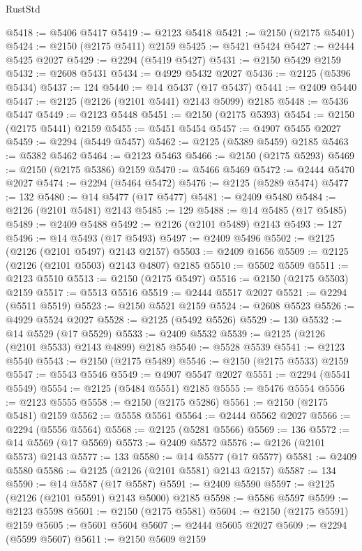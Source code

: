 \begin{lexlean}{RustStd}
\begin{coremodule}
@5418 := @5406 @5417
@5419 := @2123 @5418
@5421 := @2150 (@2175 @5401)
@5424 := @2150 (@2175 @5411) @2159
@5425 := @5421 @5424
@5427 := @2444 @5425 @2027
@5429 := @2294 (@5419 @5427)
@5431 := @2150 @5429 @2159
@5432 := @2608 @5431
@5434 := @4929 @5432 @2027
@5436 := @2125 (@5396 @5434)
@5437 := 124
@5440 := @14 @5437 (@17 @5437)
@5441 := @2409 @5440
@5447 := @2125 (@2126 (@2101 @5441) @2143 @5099) @2185
@5448 := @5436 @5447
@5449 := @2123 @5448
@5451 := @2150 (@2175 @5393)
@5454 := @2150 (@2175 @5441) @2159
@5455 := @5451 @5454
@5457 := @4907 @5455 @2027
@5459 := @2294 (@5449 @5457)
@5462 := @2125 (@5389 @5459) @2185
@5463 := @5382 @5462
@5464 := @2123 @5463
@5466 := @2150 (@2175 @5293)
@5469 := @2150 (@2175 @5386) @2159
@5470 := @5466 @5469
@5472 := @2444 @5470 @2027
@5474 := @2294 (@5464 @5472)
@5476 := @2125 (@5289 @5474)
@5477 := 132
@5480 := @14 @5477 (@17 @5477)
@5481 := @2409 @5480
@5484 := @2126 (@2101 @5481) @2143
@5485 := 129
@5488 := @14 @5485 (@17 @5485)
@5489 := @2409 @5488
@5492 := @2126 (@2101 @5489) @2143
@5493 := 127
@5496 := @14 @5493 (@17 @5493)
@5497 := @2409 @5496
@5502 := @2125 (@2126 (@2101 @5497) @2143 @2157)
@5503 := @2409 @1656
@5509 := @2125 (@2126 (@2101 @5503) @2143 @4807) @2185
@5510 := @5502 @5509
@5511 := @2123 @5510
@5513 := @2150 (@2175 @5497)
@5516 := @2150 (@2175 @5503) @2159
@5517 := @5513 @5516
@5519 := @2444 @5517 @2027
@5521 := @2294 (@5511 @5519)
@5523 := @2150 @5521 @2159
@5524 := @2608 @5523
@5526 := @4929 @5524 @2027
@5528 := @2125 (@5492 @5526)
@5529 := 130
@5532 := @14 @5529 (@17 @5529)
@5533 := @2409 @5532
@5539 := @2125 (@2126 (@2101 @5533) @2143 @4899) @2185
@5540 := @5528 @5539
@5541 := @2123 @5540
@5543 := @2150 (@2175 @5489)
@5546 := @2150 (@2175 @5533) @2159
@5547 := @5543 @5546
@5549 := @4907 @5547 @2027
@5551 := @2294 (@5541 @5549)
@5554 := @2125 (@5484 @5551) @2185
@5555 := @5476 @5554
@5556 := @2123 @5555
@5558 := @2150 (@2175 @5286)
@5561 := @2150 (@2175 @5481) @2159
@5562 := @5558 @5561
@5564 := @2444 @5562 @2027
@5566 := @2294 (@5556 @5564)
@5568 := @2125 (@5281 @5566)
@5569 := 136
@5572 := @14 @5569 (@17 @5569)
@5573 := @2409 @5572
@5576 := @2126 (@2101 @5573) @2143
@5577 := 133
@5580 := @14 @5577 (@17 @5577)
@5581 := @2409 @5580
@5586 := @2125 (@2126 (@2101 @5581) @2143 @2157)
@5587 := 134
@5590 := @14 @5587 (@17 @5587)
@5591 := @2409 @5590
@5597 := @2125 (@2126 (@2101 @5591) @2143 @5000) @2185
@5598 := @5586 @5597
@5599 := @2123 @5598
@5601 := @2150 (@2175 @5581)
@5604 := @2150 (@2175 @5591) @2159
@5605 := @5601 @5604
@5607 := @2444 @5605 @2027
@5609 := @2294 (@5599 @5607)
@5611 := @2150 @5609 @2159

\end{coremodule}
\end{lexlean}
